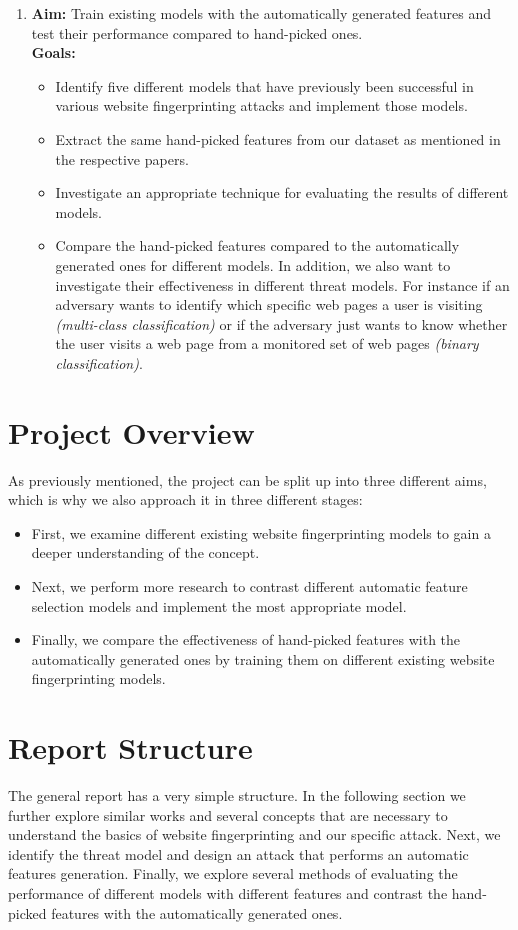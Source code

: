 \begin{enumerate}
   \item \textbf{Aim:} Train existing models with the automatically generated features and test their performance compared to hand-picked ones.\\
   \textbf{Goals:}
   \begin{itemize}
      \item Identify five different models that have previously been successful in various website fingerprinting attacks and implement those models.
      \item Extract the same hand-picked features from our dataset as mentioned in the respective papers.
      \item Investigate an appropriate technique for evaluating the results of different models.
      \item Compare the hand-picked features compared to the automatically generated ones for different models. In addition, we also want to investigate
         their effectiveness in different threat models. For instance if an adversary wants to identify which specific web pages a user is visiting \textit{(multi-class classification)} or
         if the adversary just wants to know whether the user visits a web page from a monitored set of web pages \textit{(binary classification)}.
   \end{itemize}

\end{enumerate}

\newpage

\section{Project Overview}
As previously mentioned, the project can be split up into three different aims, which is why we also approach it in three different stages:

\begin{itemize}
\item First, we examine different existing website fingerprinting models to gain a deeper understanding of the concept.
\item Next, we perform more research to contrast different automatic feature selection models and implement the most appropriate model.
\item Finally, we compare the effectiveness of hand-picked features with the automatically generated ones by training them on different existing website fingerprinting models.
\end{itemize}


\section{Report Structure}
The general report has a very simple structure.
In the following section we further explore similar works and several concepts that are necessary to understand the basics of website fingerprinting and our specific attack.
Next, we identify the threat model and design an attack that performs an automatic features generation.
Finally, we explore several methods of evaluating the performance of different models with different features and contrast the hand-picked
features with the automatically generated ones.
